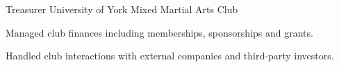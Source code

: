 \begin{cventries}
  \cventry
    {Treasurer}
    {University of York Mixed Martial Arts Club}
    {}
    {}
    {
      \begin{cvitems}
        \item {Managed club finances including memberships, sponsorships and grants.}
        \vspace{0.5mm}
        \item {Handled club interactions with external companies and third-party investors.}
      \end{cvitems}
    }
\end{cventries}
